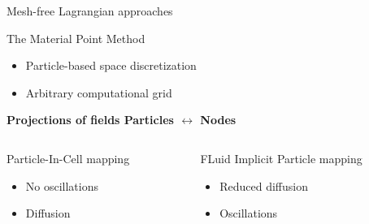 \begin{withoutheadline}
  \begin{frame}{Mesh-free Lagrangian approaches}
    
    \begin{block}{The Material Point Method \cite{Sulsky94}}
      \begin{footnotesize}
        \begin{itemize}
        \item Particle-based space discretization
        \item Arbitrary computational grid
        \end{itemize}
      \end{footnotesize}
      
      \centering
      \textbf{Projections of fields Particles $\leftrightarrow$ Nodes}
    \end{block}

    \begin{columns}
      \begin{column}{0.48\textwidth}
        \begin{block}{\footnotesize Particle-In-Cell mapping \cite{PIC}}
          \begin{footnotesize}
            \begin{itemize}
            \item[] No oscillations 
            \item[] Diffusion
            \end{itemize}
          \end{footnotesize}
        \end{block}
      \end{column}
      \begin{column}{0.48\textwidth}
        \begin{block}{\footnotesize FLuid Implicit Particle mapping \cite{PIC_Nishiguchi}}
          \begin{footnotesize}
            \begin{itemize}
            \item[] Reduced diffusion 
            \item[] Oscillations
            \end{itemize}
          \end{footnotesize}
        \end{block}
      \end{column}
    \end{columns}
    \vspace{-0.3cm}
  \end{frame}
\end{withoutheadline}

